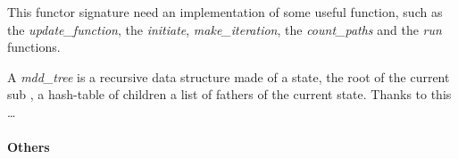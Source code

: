 This functor signature need an implementation of some useful function, such as the \textit{update\_function}, the \textit{initiate}, \textit{make\_iteration}, the \textit{count\_paths} and the \textit{run} functions.

A \textit{mdd\_tree} is a recursive data structure made of a state, the root of the current sub \mdd, a hash-table of children a list of fathers of the current state. Thanks to this \dots{}

\paragraph{Others}
